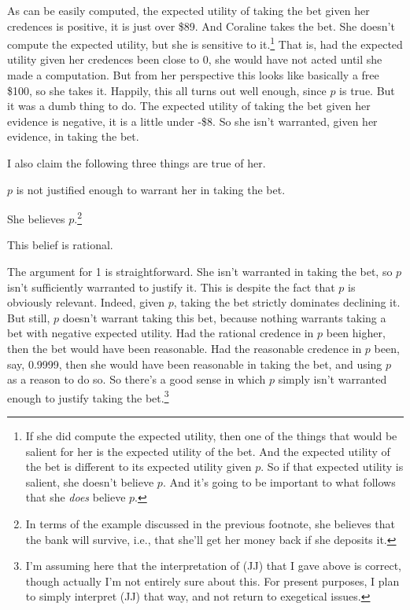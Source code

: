 \noindent As can be easily computed, the expected utility of taking the bet given her credences is positive, it is just over \$89. And Coraline takes the bet. She doesn't compute the expected utility, but she is sensitive to it.\footnote{If she did compute the expected utility, then one of the things that would be salient for her is the expected utility of the bet. And the expected utility of the bet is different to its expected utility given \(p\). So if that expected utility is salient, she doesn't believe \(p\). And it's going to be important to what follows that she \textit{does} believe \(p\).} That is, had the expected utility given her credences been close to 0, she would have not acted until she made a computation. But from her perspective this looks like basically a free \$100, so she takes it. Happily, this all turns out well enough, since \(p\) is true. But it was a dumb thing to do. The expected utility of taking the bet given her evidence is negative, it is a little under -\$8. So she isn't warranted, given her evidence, in taking the bet.

I also claim the following three things are true of her.

\begin{enumerate*}
\item \(p\) is not justified enough to warrant her in taking the bet.
\item She believes \(p\).\footnote{In terms of the example discussed in the previous footnote, she believes that the bank will survive, i.e., that she'll get her money back if she deposits it.}
\item This belief is rational.
\end{enumerate*}

\noindent The argument for 1 is straightforward. She isn't warranted in taking the bet, so \(p\) isn't sufficiently warranted to justify it. This is despite the fact that \(p\) is obviously relevant. Indeed, given \(p\), taking the bet strictly dominates declining it. But still, \(p\) doesn't warrant taking this bet, because nothing warrants taking a bet with negative expected utility. Had the rational credence in \(p\) been higher, then the bet would have been reasonable. Had the reasonable credence in \(p\) been, say, 0.9999, then she would have been reasonable in taking the bet, and using \(p\) as a reason to do so. So there's a good sense in which \(p\) simply isn't warranted enough to justify taking the bet.\footnote{I'm assuming here that the interpretation of (JJ) that I gave above is correct, though actually I'm not entirely sure about this. For present purposes, I plan to simply interpret (JJ) that way, and not return to exegetical issues.}

